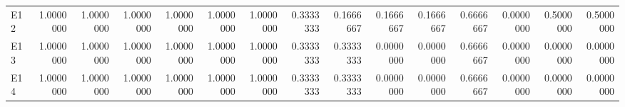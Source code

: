 \begin{table}[!h]
{\begin{tabular}[t]{lrrrrrrrrrrrrrr}
E12 & 1.0000000 & 1.0000000 & 1.0000000 & 1.0000000 & 1.0000000 & 1.0000000 & 0.3333333 & 0.1666667 & 0.1666667 & 0.1666667 & 0.6666667 & 0.0000000 & 0.5000000 & 0.5000000\\
E13 & 1.0000000 & 1.0000000 & 1.0000000 & 1.0000000 & 1.0000000 & 1.0000000 & 0.3333333 & 0.3333333 & 0.0000000 & 0.0000000 & 0.6666667 & 0.0000000 & 0.0000000 & 0.0000000\\
E14 & 1.0000000 & 1.0000000 & 1.0000000 & 1.0000000 & 1.0000000 & 1.0000000 & 0.3333333 & 0.3333333 & 0.0000000 & 0.0000000 & 0.6666667 & 0.0000000 & 0.0000000 & 0.0000000\\
\bottomrule
\end{tabular}}
\end{table}

